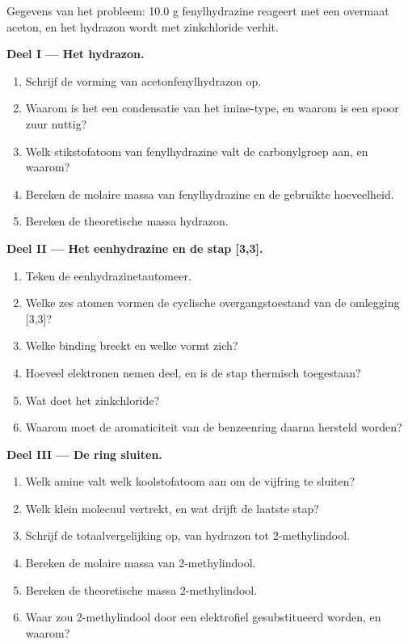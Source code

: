 \begin{problem}
\label{pb:b3:heterocycles:1}
Gegevens van het probleem: 10.0 g fenylhydrazine reageert met een
overmaat aceton, en het hydrazon wordt met zinkchloride verhit.

\medskip\noindent\textbf{Deel I --- Het hydrazon.}
\begin{enumerate}
  \item Schrijf de vorming van acetonfenylhydrazon op.
  \item Waarom is het een condensatie van het imine-type, en waarom is
        een spoor zuur nuttig?
  \item Welk stikstofatoom van fenylhydrazine valt de carbonylgroep aan,
        en waarom?
  \item Bereken de molaire massa van fenylhydrazine en de gebruikte
        hoeveelheid.
  \item Bereken de theoretische massa hydrazon.
\end{enumerate}

\medskip\noindent\textbf{Deel II --- Het eenhydrazine en de stap [3,3].}
\begin{enumerate}[resume]
  \item Teken de eenhydrazinetautomeer.
  \item Welke zes atomen vormen de cyclische overgangstoestand van de
        omlegging [3,3]?
  \item Welke binding breekt en welke vormt zich?
  \item Hoeveel elektronen nemen deel, en is de stap thermisch toegestaan?
  \item Wat doet het zinkchloride?
  \item Waarom moet de aromaticiteit van de benzeenring daarna hersteld
        worden?
\end{enumerate}

\medskip\noindent\textbf{Deel III --- De ring sluiten.}
\begin{enumerate}[resume]
  \item Welk amine valt welk koolstofatoom aan om de vijfring te sluiten?
  \item Welk klein molecuul vertrekt, en wat drijft de laatste stap?
  \item Schrijf de totaalvergelijking op, van hydrazon tot 2-methylindool.
  \item Bereken de molaire massa van 2-methylindool.
  \item Bereken de theoretische massa 2-methylindool.
  \item Waar zou 2-methylindool door een elektrofiel gesubstitueerd
        worden, en waarom?
\end{enumerate}


\end{problem}
